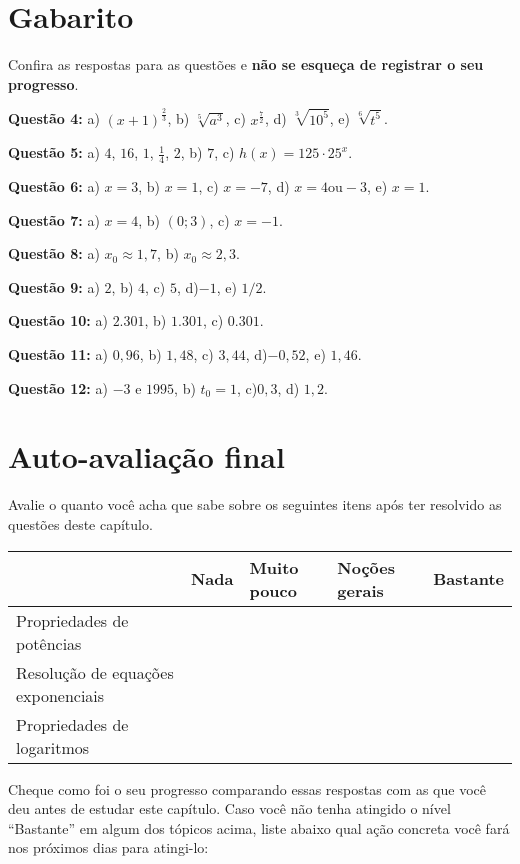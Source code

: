 \documentclass[main_estudante.tex]{subfiles}
\begin{document}
\section{Gabarito}

Confira as respostas para as questões e \textbf{não se esqueça de registrar o seu progresso}.

\imprimeGabarito 

\noindent\textbf{Questão 4:} a) $(x+1)^{\frac{2}{3}}$, b) $\sqrt[5]{a^3}$, c) $x^{\frac{7}{2}}$, d) $\sqrt[3]{10^5}$, e) $\sqrt[6]{t^5}$.

\noindent\textbf{Questão 5:} a) $4$, $16$, $1$, $\frac{1}{4}$, $2$, b) $7$, c) $h(x)=125 \cdot 25^x$.

\noindent\textbf{Questão 6:} a) $x=3$, b) $x=1$, c) $x=-7$, d) $x=4 \text{ou} -3$, e) $x=1$.

\noindent\textbf{Questão 7:} a) $x=4$, b) $(0;3)$, c) $x=-1$.

\noindent\textbf{Questão 8:} a) $x_0 \approx 1,7$, b) $x_0 \approx 2,3$.

\noindent\textbf{Questão 9:} a) $2$, b) $4$, c) $5$, d)$-1$, e) $1/2$.

\noindent\textbf{Questão 10:} a) $2.301$, b) $1.301$, c) $0.301$.

\noindent\textbf{Questão 11:} a) $0,96$, b) $1,48$, c) $3,44$, d)$-0,52$, e) $1,46$.

\noindent\textbf{Questão 12:} a) $-3$ e $1995$, b) $t_0=1$, c)$0,3$, d) $1,2$.


\section{Auto-avaliação final}
Avalie o quanto você acha que sabe sobre os seguintes itens após ter resolvido as questões deste capítulo.

\paraFolhaAvaliacoes

\begin{center}
 \begin{tabular}{|p{35mm}||p{15mm}|p{15mm}|p{15mm}|p{15mm}|} 
 \hline
   & Nada & Muito pouco & Noções gerais & Bastante\\
 \hline
 Propriedades de potências &  &  &  &  \\ 
 \hline
 Resolução de equações exponenciais&  &  &  &  \\
 \hline
 Propriedades de logaritmos &  &  &  &  \\
 \hline
\end{tabular}
\end{center}

Cheque como foi o seu progresso comparando essas respostas com as que você deu antes de estudar este capítulo. Caso você não tenha atingido o nível ``Bastante''  em algum dos tópicos acima, liste abaixo qual ação concreta você fará nos próximos dias para atingi-lo:

\paraAmbos
\end{document}
